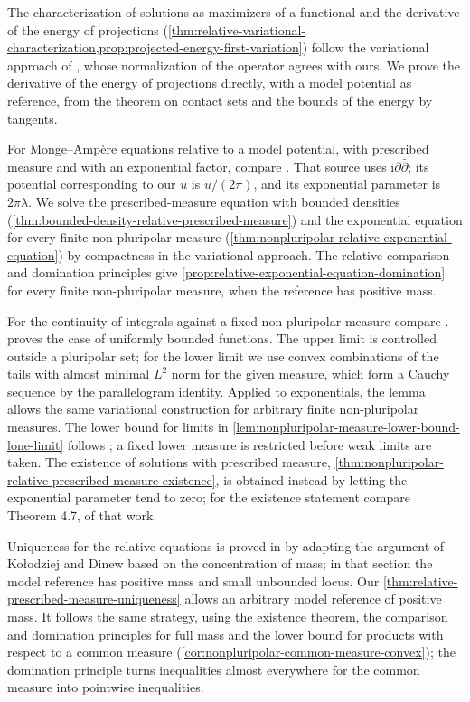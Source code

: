 The characterization of solutions as maximizers of a functional and the derivative of the energy of projections (\cref{thm:relative-variational-characterization,prop:projected-energy-first-variation}) follow the variational approach of \cite[Theorem 4.1 and Lemma 4.2]{BBGZ13}, whose normalization of the operator agrees with ours. We prove the derivative of the energy of projections directly, with a model potential as reference, from the theorem on contact sets and the bounds of the energy by tangents.

For Monge--Amp\`ere equations relative to a model potential, with prescribed measure and with an exponential factor, compare \cite[Theorem 4.3; Theorem 5.3 and Lemma 5.4]{DDNL19log}. That source uses $\mathrm{i}\partial\bar\partial$; its potential corresponding to our $u$ is $u/(2\pi)$, and its exponential parameter is $2\pi\lambda$. We solve the prescribed-measure equation with bounded densities (\cref{thm:bounded-density-relative-prescribed-measure}) and the exponential equation for every finite non-pluripolar measure (\cref{thm:nonpluripolar-relative-exponential-equation}) by compactness in the variational approach. The relative comparison and domination principles give \cref{prop:relative-exponential-equation-domination} for every finite non-pluripolar measure, when the reference has positive mass.

For the continuity of integrals against a fixed non-pluripolar measure compare \cite[Theorem 3.10]{BBGZ13}.  proves the case of uniformly bounded functions. The upper limit is controlled outside a pluripolar set; for the lower limit we use convex combinations of the tails with almost minimal $L^2$ norm for the given measure, which form a Cauchy sequence by the parallelogram identity. Applied to exponentials, the lemma allows the same variational construction for arbitrary finite non-pluripolar measures. The lower bound for limits in \cref{lem:nonpluripolar-measure-lower-bound-lone-limit} follows \cite[Lemma 2.8]{DDNL19log}; a fixed lower measure is restricted before weak limits are taken. The existence of solutions with prescribed measure, \cref{thm:nonpluripolar-relative-prescribed-measure-existence}, is obtained instead by letting the exponential parameter tend to zero; for the existence statement compare Theorem 4.7, of that work.

Uniqueness for the relative equations is proved in \cite[Theorem 4.29 and its proof]{DDNL18mono} by adapting the argument of Ko\l{}odziej and Dinew based on the concentration of mass; in that section the model reference has positive mass and small unbounded locus. Our \cref{thm:relative-prescribed-measure-uniqueness} allows an arbitrary model reference of positive mass. It follows the same strategy, using the existence theorem, the comparison and domination principles for full mass and the lower bound for products with respect to a common measure (\cref{cor:nonpluripolar-common-measure-convex}); the domination principle turns inequalities almost everywhere for the common measure into pointwise inequalities.

